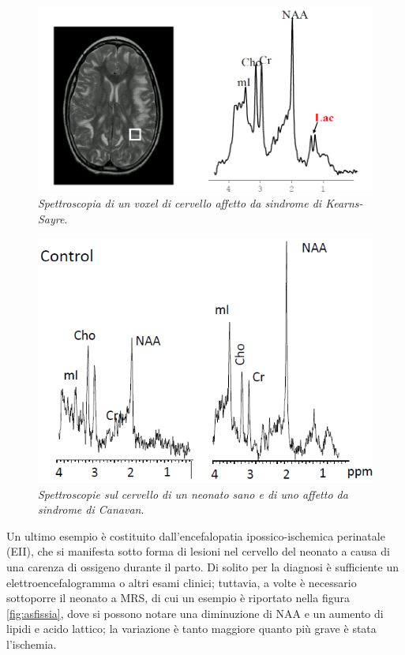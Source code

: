 \documentclass{report}
\newcommand{\figref}[1]{figura \ref{#1}}
\numberwithin{equation}{section}
\numberwithin{figure}{section}
\begin{document}
\begin{figure}[htp]
\centering
\includegraphics[scale=0.57]{immagini/ks.png}
\caption{\label{fig:ks} \textit{Spettroscopia di un voxel di cervello affetto da sindrome di Kearns-Sayre}.}
\end{figure}

\vspace{-10 pt}

\begin{figure}[htp]
\centering
\includegraphics[scale=0.78]{immagini/canavan.png}
\caption{\label{fig:canavan} \textit{Spettroscopie sul cervello di un neonato sano e di uno affetto da sindrome di Canavan}.}
\end{figure}

\noindent Un ultimo esempio è costituito dall'encefalopatia ipossico-ischemica perinatale (EII), che si manifesta sotto forma di lesioni nel cervello del neonato a causa di una carenza di ossigeno durante il parto. Di solito per la diagnosi è sufficiente un elettroencefalogramma o altri esami clinici; tuttavia, a volte è necessario sottoporre il neonato a MRS, di cui un esempio è riportato nella \figref{fig:asfissia}, dove si possono notare una diminuzione di NAA e un aumento di lipidi e acido lattico; la variazione è tanto maggiore quanto più grave è stata l'ischemia.
\end{document}
